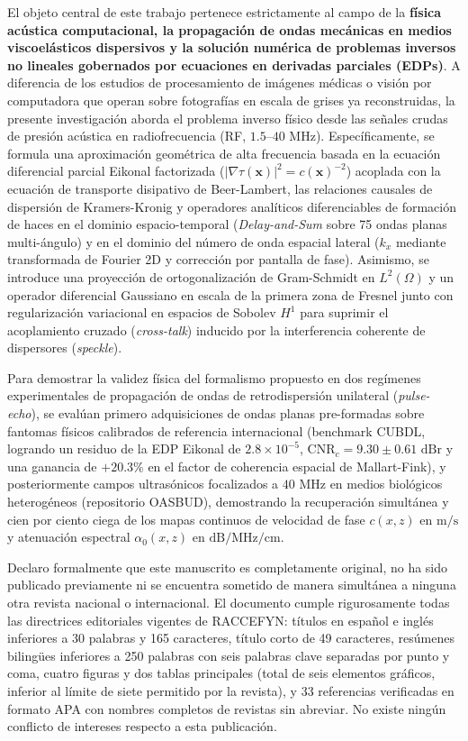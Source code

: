 \documentclass[11pt,a4paper]{article}
\begin{document}
El objeto central de este trabajo pertenece estrictamente al campo de la \textbf{física acústica computacional, la propagación de ondas mecánicas en medios viscoelásticos dispersivos y la solución numérica de problemas inversos no lineales gobernados por ecuaciones en derivadas parciales (EDPs)}. A diferencia de los estudios de procesamiento de imágenes médicas o visión por computadora que operan sobre fotografías en escala de grises ya reconstruidas, la presente investigación aborda el problema inverso físico desde las señales crudas de presión acústica en radiofrecuencia (RF, $1.5\text{--}40\text{ MHz}$). Específicamente, se formula una aproximación geométrica de alta frecuencia basada en la ecuación diferencial parcial Eikonal factorizada ($\lvert\nabla\tau(\mathbf{x})\rvert^2 = c(\mathbf{x})^{-2}$) acoplada con la ecuación de transporte disipativo de Beer-Lambert, las relaciones causales de dispersión de Kramers-Kronig y operadores analíticos diferenciables de formación de haces en el dominio espacio-temporal (\textit{Delay-and-Sum} sobre 75 ondas planas multi-ángulo) y en el dominio del número de onda espacial lateral ($k_x$ mediante transformada de Fourier 2D y corrección por pantalla de fase). Asimismo, se introduce una proyección de ortogonalización de Gram-Schmidt en $L^2(\Omega)$ y un operador diferencial Gaussiano en escala de la primera zona de Fresnel junto con regularización variacional en espacios de Sobolev $H^1$ para suprimir el acoplamiento cruzado (\textit{cross-talk}) inducido por la interferencia coherente de dispersores (\textit{speckle}).

Para demostrar la validez física del formalismo propuesto en dos regímenes experimentales de propagación de ondas de retrodispersión unilateral (\textit{pulse-echo}), se evalúan primero adquisiciones de ondas planas pre-formadas sobre fantomas físicos calibrados de referencia internacional (benchmark CUBDL, logrando un residuo de la EDP Eikonal de $2.8 \times 10^{-5}$, $\text{CNR}_c = 9.30 \pm 0.61\text{ dBr}$ y una ganancia de $+20.3\%$ en el factor de coherencia espacial de Mallart-Fink), y posteriormente campos ultrasónicos focalizados a $40\text{ MHz}$ en medios biológicos heterogéneos (repositorio OASBUD), demostrando la recuperación simultánea y cien por ciento ciega de los mapas continuos de velocidad de fase $c(x,z)$ en $\text{m/s}$ y atenuación espectral $\alpha_0(x,z)$ en $\text{dB/MHz/cm}$.

Declaro formalmente que este manuscrito es completamente original, no ha sido publicado previamente ni se encuentra sometido de manera simultánea a ninguna otra revista nacional o internacional. El documento cumple rigurosamente todas las directrices editoriales vigentes de RACCEFYN: títulos en español e inglés inferiores a 30 palabras y 165 caracteres, título corto de 49 caracteres, resúmenes bilingües inferiores a 250 palabras con seis palabras clave separadas por punto y coma, cuatro figuras y dos tablas principales (total de seis elementos gráficos, inferior al límite de siete permitido por la revista), y 33 referencias verificadas en formato APA con nombres completos de revistas sin abreviar. No existe ningún conflicto de intereses respecto a esta publicación.
\end{document}
